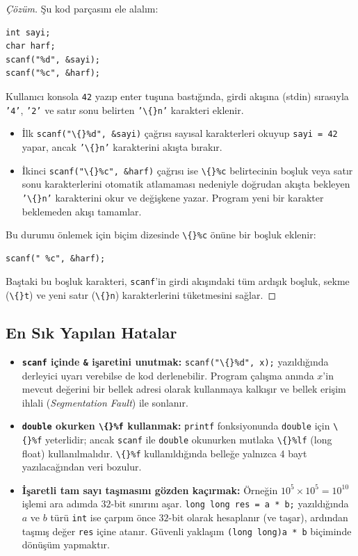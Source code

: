 \begin{proof}[Çözüm]
Şu kod parçasını ele alalım:
\begin{lstlisting}[language=CTemel]
int sayi;
char harf;
scanf("%d", &sayi);
scanf("%c", &harf);
\end{lstlisting}
Kullanıcı konsola \texttt{42} yazıp enter tuşuna bastığında, girdi akışına (stdin) sırasıyla \texttt{'4'}, \texttt{'2'} ve satır sonu belirten \texttt{'\textbackslash\{\}n'} karakteri eklenir. 
\begin{itemize}
    \item İlk \texttt{scanf("\textbackslash\{\}\%d", \&sayi)} çağrısı sayısal karakterleri okuyup \texttt{sayi = 42} yapar, ancak \texttt{'\textbackslash\{\}n'} karakterini akışta bırakır.
    \item İkinci \texttt{scanf("\textbackslash\{\}\%c", \&harf)} çağrısı ise \texttt{\textbackslash\{\}\%c} belirtecinin boşluk veya satır sonu karakterlerini otomatik atlamaması nedeniyle doğrudan akışta bekleyen \texttt{'\textbackslash\{\}n'} karakterini okur ve değişkene yazar. Program yeni bir karakter beklemeden akışı tamamlar.
\end{itemize}

Bu durumu önlemek için biçim dizesinde \texttt{\textbackslash\{\}\%c} önüne bir boşluk eklenir:
\begin{lstlisting}[language=CTemel]
scanf(" %c", &harf);
\end{lstlisting}
Baştaki bu boşluk karakteri, \texttt{scanf}'in girdi akışındaki tüm ardışık boşluk, sekme (\texttt{\textbackslash\{\}t}) ve yeni satır (\texttt{\textbackslash\{\}n}) karakterlerini tüketmesini sağlar.
\end{proof}

\subsection{En Sık Yapılan Hatalar}
\begin{itemize}
    \item \textbf{\texttt{scanf} içinde \texttt{\&} işaretini unutmak:} \texttt{scanf("\textbackslash\{\}\%d", x);} yazıldığında derleyici uyarı verebilse de kod derlenebilir. Program çalışma anında $x$'in mevcut değerini bir bellek adresi olarak kullanmaya kalkışır ve bellek erişim ihlali (\textit{Segmentation Fault}) ile sonlanır.
    \item \textbf{\texttt{double} okurken \texttt{\textbackslash\{\}\%f} kullanmak:} \texttt{printf} fonksiyonunda \texttt{double} için \texttt{\textbackslash\{\}\%f} yeterlidir; ancak \texttt{scanf} ile \texttt{double} okunurken mutlaka \texttt{\textbackslash\{\}\%lf} (long float) kullanılmalıdır. \texttt{\textbackslash\{\}\%f} kullanıldığında belleğe yalnızca 4 bayt yazılacağından veri bozulur.
    \item \textbf{İşaretli tam sayı taşmasını gözden kaçırmak:} Örneğin $10^5 \times 10^5 = 10^{10}$ işlemi ara adımda $32$-bit sınırını aşar. \texttt{long long res = a * b;} yazıldığında $a$ ve $b$ türü \texttt{int} ise çarpım önce $32$-bit olarak hesaplanır (ve taşar), ardından taşmış değer \texttt{res} içine atanır. Güvenli yaklaşım \texttt{(long long)a * b} biçiminde dönüşüm yapmaktır.
\end{itemize}


